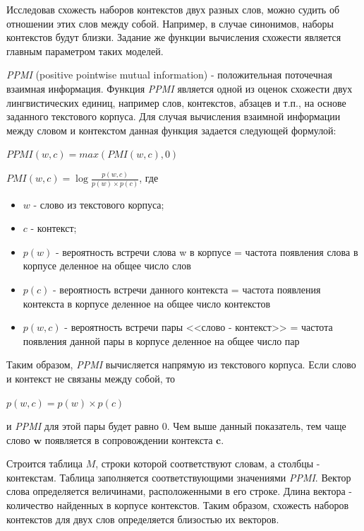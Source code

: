 Исследовав схожесть наборов контекстов двух разных слов, можно судить об отношении
этих слов между собой. Например, в случае синонимов, наборы контекстов будут близки.
Задание же функции вычисления схожести является главным параметром таких моделей.

\textit{PPMI} (positive pointwise mutual information) - положительная поточечная взаимная
информация. Функция \textit{PPMI} является одной из оценок схожести двух лингвистических
единиц, например слов, контекстов, абзацев и т.п., на основе заданного текстового
корпуса. Для случая вычисления взаимной информации между словом и контекстом
данная функция задается следующей формулой:

$PPMI (w, c) = max(PMI (w, c), 0)$

$PMI (w, c) = \log \frac{p(w, c)}{p(w) \times p(c)}$, где


\begin{itemize}
\item $w$ - слово из текстового корпуса;

\item $c$ - контекст;

\item $p(w)$ - вероятность встречи слова w в корпусе = частота появления слова в
корпусе деленное на общее число слов

\item $p(c)$ - вероятность встречи данного контекста = частота появления контекста в
корпусе деленное на общее число контекстов

\item $p(w,c)$ - вероятность встречи пары <<слово - контекст>> = частота появления
данной пары в корпусе деленное на общее число пар

\end{itemize}

Таким образом, \textit{PPMI} вычисляется напрямую из текстового корпуса. Если слово и
контекст не связаны между собой, то 

$p(w, c) = p(w) \times p(c)$

и \textit{PPMI} для этой пары будет равно 0. Чем выше данный показатель, тем чаще слово $\mathbf{w}$ появляется в сопровождении
контекста $\mathbf{c}$.

Строится таблица $M$, строки которой соответствуют словам, а столбцы - контекстам.
Таблица заполняется соответствующими значениями \textit{PPMI}. Вектор слова определяется
величинами, расположенными в его строке. Длина вектора - количество найденных в
корпусе контекстов. Таким образом, схожесть наборов контекстов для двух слов
определяется близостью их векторов.

